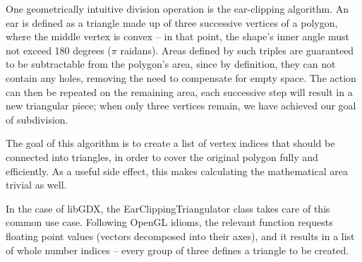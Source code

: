 One geometrically intuitive division operation is the ear-clipping algorithm. An ear is defined as a triangle made up of three successive vertices of a polygon, where the middle vertex is convex -- in that point, the shape's inner angle must not exceed 180 degrees ($\pi$ raidans).\cite{TriangulationByEarClipping} Areas defined by such triples are guaranteed to be subtractable from the polygon's area, since by definition, they can not contain any holes, removing the need to compensate for empty space. The action can then be repeated on the remaining area, each successive step will result in a new triangular piece; when only three vertices remain, we have achieved our goal of subdivision.

The goal of this algorithm is to create a list of vertex indices that should be connected into triangles, in order to cover the original polygon fully and efficiently. As a useful side effect, this makes calculating the mathematical area trivial as well.

In the case of libGDX, the EarClippingTriangulator class takes care of this common use case. Following OpenGL idioms, the relevant function requests floating point values (vectors decomposed into their axes), and it results in a list of whole number indices -- every group of three defines a triangle to be created.

